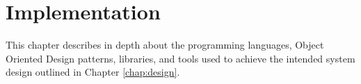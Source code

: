 \newpage
\chapter{Implementation}
This chapter describes in depth about the programming languages, Object Oriented Design patterns, libraries, and tools used to achieve the intended system design 
outlined in Chapter \ref{chap:design}.

%



